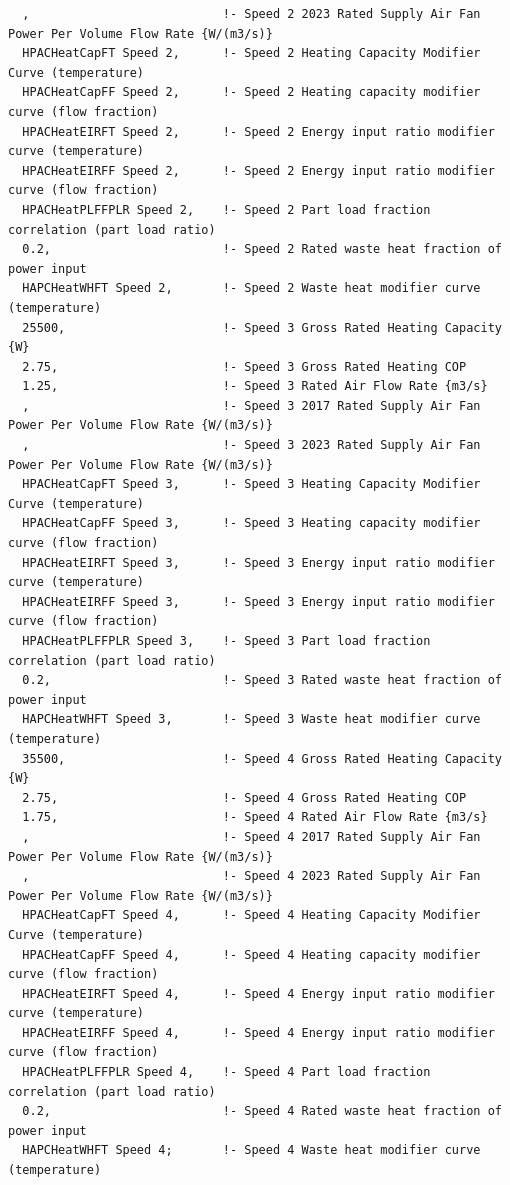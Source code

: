 \begin{lstlisting}
  ,                           !- Speed 2 2023 Rated Supply Air Fan Power Per Volume Flow Rate {W/(m3/s)}
  HPACHeatCapFT Speed 2,      !- Speed 2 Heating Capacity Modifier Curve (temperature)
  HPACHeatCapFF Speed 2,      !- Speed 2 Heating capacity modifier curve (flow fraction)
  HPACHeatEIRFT Speed 2,      !- Speed 2 Energy input ratio modifier curve (temperature)
  HPACHeatEIRFF Speed 2,      !- Speed 2 Energy input ratio modifier curve (flow fraction)
  HPACHeatPLFFPLR Speed 2,    !- Speed 2 Part load fraction correlation (part load ratio)
  0.2,                        !- Speed 2 Rated waste heat fraction of power input
  HAPCHeatWHFT Speed 2,       !- Speed 2 Waste heat modifier curve (temperature)
  25500,                      !- Speed 3 Gross Rated Heating Capacity {W}
  2.75,                       !- Speed 3 Gross Rated Heating COP
  1.25,                       !- Speed 3 Rated Air Flow Rate {m3/s}
  ,                           !- Speed 3 2017 Rated Supply Air Fan Power Per Volume Flow Rate {W/(m3/s)}
  ,                           !- Speed 3 2023 Rated Supply Air Fan Power Per Volume Flow Rate {W/(m3/s)}
  HPACHeatCapFT Speed 3,      !- Speed 3 Heating Capacity Modifier Curve (temperature)
  HPACHeatCapFF Speed 3,      !- Speed 3 Heating capacity modifier curve (flow fraction)
  HPACHeatEIRFT Speed 3,      !- Speed 3 Energy input ratio modifier curve (temperature)
  HPACHeatEIRFF Speed 3,      !- Speed 3 Energy input ratio modifier curve (flow fraction)
  HPACHeatPLFFPLR Speed 3,    !- Speed 3 Part load fraction correlation (part load ratio)
  0.2,                        !- Speed 3 Rated waste heat fraction of power input
  HAPCHeatWHFT Speed 3,       !- Speed 3 Waste heat modifier curve (temperature)
  35500,                      !- Speed 4 Gross Rated Heating Capacity {W}
  2.75,                       !- Speed 4 Gross Rated Heating COP
  1.75,                       !- Speed 4 Rated Air Flow Rate {m3/s}
  ,                           !- Speed 4 2017 Rated Supply Air Fan Power Per Volume Flow Rate {W/(m3/s)}
  ,                           !- Speed 4 2023 Rated Supply Air Fan Power Per Volume Flow Rate {W/(m3/s)}
  HPACHeatCapFT Speed 4,      !- Speed 4 Heating Capacity Modifier Curve (temperature)
  HPACHeatCapFF Speed 4,      !- Speed 4 Heating capacity modifier curve (flow fraction)
  HPACHeatEIRFT Speed 4,      !- Speed 4 Energy input ratio modifier curve (temperature)
  HPACHeatEIRFF Speed 4,      !- Speed 4 Energy input ratio modifier curve (flow fraction)
  HPACHeatPLFFPLR Speed 4,    !- Speed 4 Part load fraction correlation (part load ratio)
  0.2,                        !- Speed 4 Rated waste heat fraction of power input
  HAPCHeatWHFT Speed 4;       !- Speed 4 Waste heat modifier curve (temperature)
\end{lstlisting}

